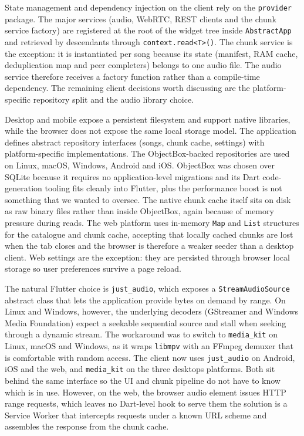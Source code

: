 \indent \par State management and dependency injection on the client rely on the \texttt{provider} package. The major services (audio, WebRTC, REST clients and the chunk service factory) are registered at the root of the widget tree inside \texttt{AbstractApp} and retrieved by descendants through \texttt{context.read<T>()}. The chunk service is the exception: it is instantiated per song because its state (manifest, RAM cache, deduplication map and peer completers) belongs to one audio file. The audio service therefore receives a factory function rather than a compile-time dependency. The remaining client decisions worth discussing are the platform-specific repository split and the audio library choice.

\indent \par Desktop and mobile expose a persistent filesystem and support native libraries, while the browser does not expose the same local storage model. The application defines abstract repository interfaces (songs, chunk cache, settings) with platform-specific implementations. The ObjectBox-backed repositories are used on Linux, macOS, Windows, Android and iOS. ObjectBox was chosen over SQLite because it requires no application-level migrations and its Dart code-generation tooling fits cleanly into Flutter, plus the performance boost is not something that we wanted to oversee. The native chunk cache itself sits on disk as raw binary files rather than inside ObjectBox, again because of memory pressure during reads. The web platform uses in-memory \texttt{Map} and \texttt{List} structures for the catalogue and chunk cache, accepting that locally cached chunks are lost when the tab closes and the browser is therefore a weaker seeder than a desktop client. Web settings are the exception: they are persisted through browser local storage so user preferences survive a page reload.

\indent \par The natural Flutter choice is \texttt{just\_audio}, which exposes a \texttt{StreamAudioSource} abstract class that lets the application provide bytes on demand by range. On Linux and Windows, however, the underlying decoders (GStreamer and Windows Media Foundation) expect a seekable sequential source and stall when seeking through a dynamic stream. The workaround was to switch to \texttt{media\_kit} on Linux, macOS and Windows, as it wraps \texttt{libmpv} with an FFmpeg demuxer that is comfortable with random access. The client now uses \texttt{just\_audio} on Android, iOS and the web, and \texttt{media\_kit} on the three desktops platforms. Both sit behind the same interface so the UI and chunk pipeline do not have to know which is in use. However, on the web, the browser audio element issues HTTP range requests, which leaves no Dart-level hook to serve them the solution is a Service Worker that intercepts requests under a known URL scheme and assembles the response from the chunk cache.


